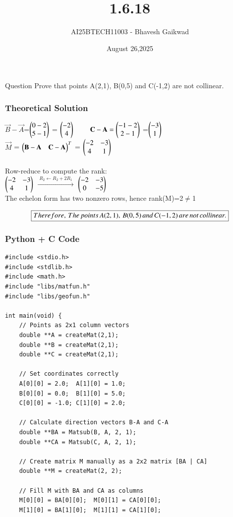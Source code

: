 \documentclass{beamer}
\title
{1.6.18}
\date{August 26,2025}
\author 
{AI25BTECH11003 - Bhavesh Gaikwad}
\begin{document}
\frame{\titlepage}
\begin{frame}{Question}
\centering
Prove that points A(2,1), B(0,5) and C(-1,2) are not collinear.
\end{frame}


\begin{frame}[fragile]
    \frametitle{Theoretical Solution}
$\vec{B}-\vec{A}$=$\myvec{0-2 \\ 5-1}$ = $\myvec{-2 \\ 4}$
$\qquad \vec{C}-\vec{A}=\myvec{-1-2 \\ 2-1}$ =$\myvec{-3 \\ 1}$ \\
$\vec{M}$ = $\myvec{\vec{B}-\vec{A} & \vec{C}-\vec{A}}^T$ = $\myvec{-2 & -3 \\ 4 & 1}$\\\\

Row-reduce to compute the rank:\\

$\myvec{-2 & -3\\ 4 & 1}$ $\xrightarrow{\;R_2\leftarrow R_2+2R_1\;}$ $\myvec{-2 & -3 \\ 0 & -5}$\\

The echelon form has two nonzero rows, hence
rank(M)=2$\neq$1

\begin{align}
    \centering
    \boxed{Therefore, \, The \, points \, A(2,1), \,B(0,5) \, and \, C(-1,2) \, are \, not \, collinear.}
\end{align}
\end{frame}


\begin{frame}[fragile]
    \frametitle{Python + C Code}
    \begin{lstlisting}
#include <stdio.h>
#include <stdlib.h>
#include <math.h>
#include "libs/matfun.h"
#include "libs/geofun.h"

int main(void) {
    // Points as 2x1 column vectors
    double **A = createMat(2,1);
    double **B = createMat(2,1);
    double **C = createMat(2,1);

    // Set coordinates correctly
    A[0][0] = 2.0;  A[1][0] = 1.0;
    B[0][0] = 0.0;  B[1][0] = 5.0;
    C[0][0] = -1.0; C[1][0] = 2.0;

    // Calculate direction vectors B-A and C-A
    double **BA = Matsub(B, A, 2, 1);
    double **CA = Matsub(C, A, 2, 1);

    // Create matrix M manually as a 2x2 matrix [BA | CA]
    double **M = createMat(2, 2);
    
    // Fill M with BA and CA as columns
    M[0][0] = BA[0][0];  M[0][1] = CA[0][0];
    M[1][0] = BA[1][0];  M[1][1] = CA[1][0];

    
 \end{lstlisting}
\end{frame}
\end{document}
